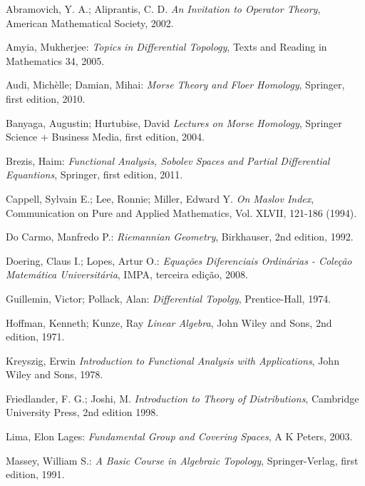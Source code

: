 \documentclass[12pt]{book}
\begin{document}
	\begin{thebibliography}{9}
		Abramovich, Y. A.; Aliprantis, C. D.
		\emph{An Invitation to Operator Theory},
		American Mathematical Society, 2002.
		
		Amyia, Mukherjee:
		\emph{Topics in Differential Topology},
		Texts and Reading in Mathematics 34,
		2005.
		
		Audi, Michèlle; Damian, Mihai:
		\emph{Morse Theory and Floer Homology},
		Springer, first edition,
		2010.
		
		Banyaga, Augustin; Hurtubise, David
		\emph{Lectures on Morse Homology},
		Springer Science + Business Media, first edition,
		2004.
		
		Brezis, Haim:
		\emph{Functional Analysis, Sobolev Spaces and Partial Differential Equantions},
		Springer, first edition,
		2011.
		
		Cappell, Sylvain E.; Lee, Ronnie; Miller, Edward Y.
		\emph{On Maslov Index}, Communication on Pure and Applied Mathematics, Vol. XLVII, 121-186 (1994).
		
		Do Carmo, Manfredo P.:
		\emph{Riemannian Geometry},
		Birkhauser, 2nd edition,
		1992.
		
		Doering, Claus I.; Lopes, Artur O.:
		\emph{Equações Diferenciais Ordinárias - Coleção Matemática Universitária},
		IMPA, terceira edição,
		2008.
		
		Guillemin, Victor; Pollack, Alan:
		\emph{Differential Topolgy},
		Prentice-Hall,
		1974.	
		
		Hoffman, Kenneth; Kunze, Ray
		\emph{Linear Algebra},
		John Wiley and Sons, 2nd edition, 1971.
		
		Kreyszig, Erwin
		\emph{Introduction to Functional Analysis with Applications},
		John Wiley and Sons, 1978.
		
		Friedlander, F. G.; Joshi, M.
		\emph{Introduction to Theory of Distributions},
		Cambridge University Press, 2nd edition
		1998.
		
		Lima, Elon Lages:
		\emph{Fundamental Group and Covering Spaces},
		A K Peters, 2003.
		
		Massey, William S.:
		\emph{A Basic Course in Algebraic Topology},
		Springer-Verlag, first edition,
		1991.
		

\end{thebibliography}
\end{document}
